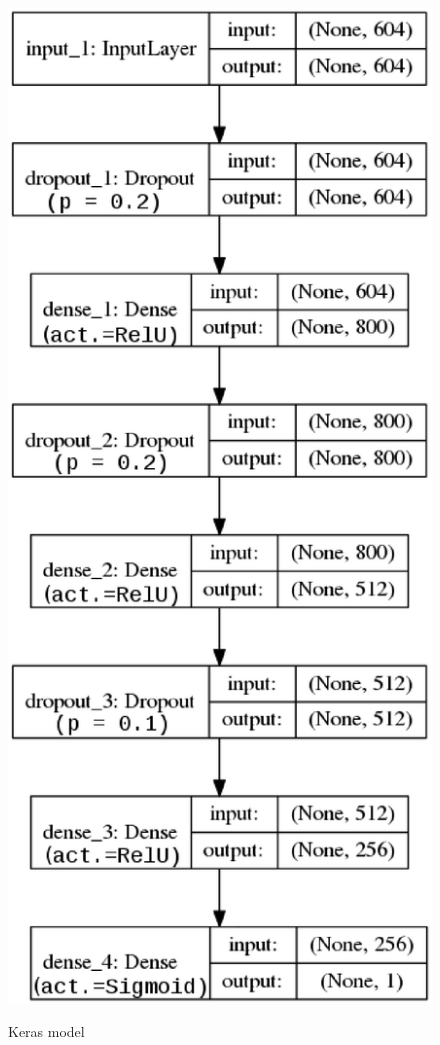 \documentclass[11pt,a4paper]{article}
\begin{document}
\begin{figure}[!htbp]
	
	\centering
	\small
	\includegraphics[scale=0.4]{keras_model2}\\
	
	\caption{Keras model}
	\label{keras_model}
\end{figure}
\end{document}
